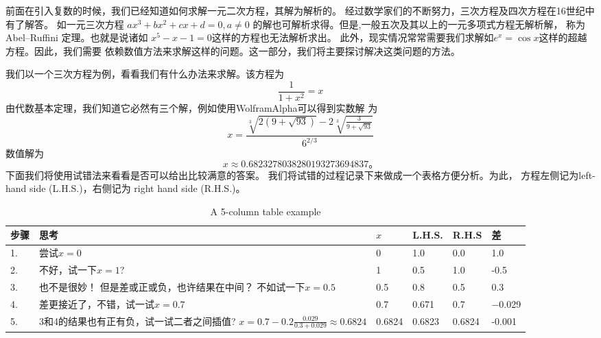 前面在引入复数的时候，我们已经知道如何求解一元二次方程，其解为解析的。
经过数学家们的不断努力，三次方程及四次方程在16世纪中有了解答。
如一元三次方程 
$
a x^3+b x^2+c x+d=0, a \neq 0
$
的解也可解析求得。但是,一般五次及其以上的一元多项式方程无解析解，
称为Abel–Ruffini 定理。也就是说诸如
$x^5 - x -1 = 0$这样的方程也无法解析求出。
此外，现实情况常常需要我们求解如$ e^x  =\cos x $这样的超越方程。因此，我们需要
依赖数值方法来求解这样的问题。这一部分，我们将主要探讨解决这类问题的方法。

我们以一个三次方程为例，看看我们有什么办法来求解。该方程为
$$
\frac{1}{1+x^2} = x 
$$
由代数基本定理，我们知道它必然有三个解，例如使用WolframAlpha可以得到实数解
为
$$
x=\frac{\sqrt[3]{2(9+\sqrt{93})}-2 \sqrt[3]{\frac{3}{9+\sqrt{93}}}}{6^{2 / 3}}
$$
数值解为
$$
 x \approx 0.6823278038280193273694837。
$$
下面我们将使用试错法来看看是否可以给出比较满意的答案。
我们将试错的过程记录下来做成一个表格方便分析。为此，
方程左侧记为left-hand side (L.H.S.)，右侧记为
right hand side (R.H.S.)。
\begin{table}[h]
    \centering
    \begin{tabular}{p{1cm} p{8cm}p{1cm}p{1cm}p{1cm}p{1cm}}
        \hline
        步骤 & 思考 & $x$ & L.H.S. & R.H.S & 差 \\ \hline
        1.& 尝试$x=0$  & 0 & 1.0 & 0.0 &  1.0 \\ \hline
        2.& 不好，试一下$x=1$? & 1 & 0.5 &  1.0 & -0.5 \\ \hline
        3.& 也不是很妙！ 但是差或正或负，也许结果在中间？
        不如试一下$x=0.5$
         & 0.5 & 0.8 & 0.5 &  0.3 \\ \hline
        4.& 差更接近了，不错，试一试$x=0.7$
         & 0.7 & 0.671 & 0.7 & −0.029 \\ \hline
        5.& 3和4的结果也有正有负，试一试二者之间插值?
        $x = 0.7-0.2\frac{0.029}{0.3+0.029} \approx 0.6824$  
        & 0.6824 & 0.6823 & 0.6824 & -0.001 \\ \hline
    \end{tabular}
    \caption{A 5-column table example}
    \label{tab:5column}
\end{table}

